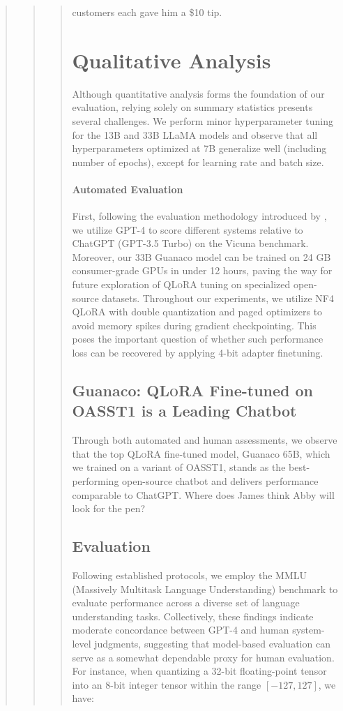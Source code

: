 \begin{quote}
\begin{quote}
{\begin{quote}
customers each gave him a \$10 tip. \section{Qualitative Analysis}

Although quantitative analysis forms the foundation of our evaluation, relying solely on summary statistics presents several challenges. We perform minor hyperparameter tuning for the 13B and 33B LLaMA models and observe that all hyperparameters optimized at 7B generalize well (including number of epochs), except for learning rate and batch size. \paragraph{Automated Evaluation} First, following the evaluation methodology introduced by \citet{vicuna2023}, we utilize GPT-4 to score different systems relative to ChatGPT (GPT-3.5 Turbo) on the Vicuna benchmark. Moreover, our 33B {Guanaco} model can be trained on 24 GB consumer-grade GPUs in under 12 hours, paving the way for future exploration of \textsc{QLoRA} tuning on specialized open-source datasets. Throughout our experiments, we utilize NF4 \textsc{QLoRA} with double quantization and paged optimizers to avoid memory spikes during gradient checkpointing. This poses the important question of whether such performance loss can be recovered by applying 4-bit adapter finetuning. \subsection{\textbf{Guanaco}: \textsc{QLoRA} Fine-tuned on OASST1 is a Leading Chatbot} Through both automated and human assessments, we observe that the top \textsc{QLoRA} fine-tuned model, {Guanaco} 65B, which we trained on a variant of OASST1, stands as the best-performing open-source chatbot and delivers performance comparable to ChatGPT. Where does James think Abby will look for the pen? \subsection{Evaluation}

Following established protocols, we employ the MMLU (Massively Multitask Language Understanding) benchmark \citep{hendrycksmeasuring} to evaluate performance across a diverse set of language understanding tasks. Collectively, these findings indicate moderate concordance between GPT-4 and human system-level judgments, suggesting that model-based evaluation can serve as a somewhat dependable proxy for human evaluation. For instance, when quantizing a 32-bit floating-point tensor into an 8-bit integer tensor within the range $[-127, 127]$, we have:


\end{quote}}
\end{quote}
\end{quote}
